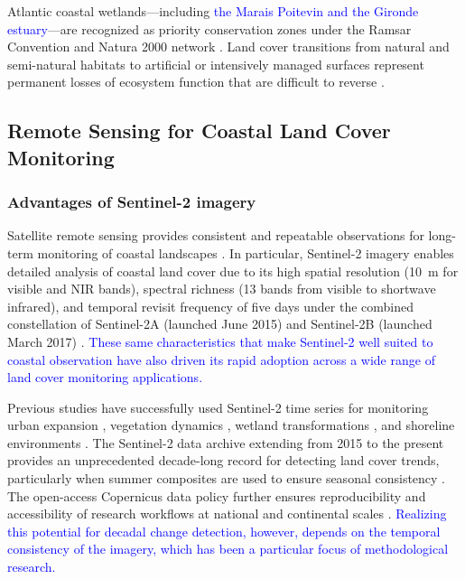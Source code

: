 \documentclass[coasts,article,submit,pdftex,moreauthors]{Definitions/mdpi}
\begin{document}
Atlantic coastal wetlands—including \textcolor{blue}{the Marais Poitevin and the Gironde estuary}—are recognized as priority conservation zones under the Ramsar Convention and Natura 2000 network \citep{barnaud2011zones,fustec2000zones,triplet2014camargue}. Land cover transitions from natural and semi-natural habitats to artificial or intensively managed surfaces represent permanent losses of ecosystem function that are difficult to reverse \citep{meur-ferec2007artificialisation,deboudt2010littoral}.

\subsection{Remote Sensing for Coastal Land Cover Monitoring}

\subsubsection{Advantages of Sentinel-2 imagery}

Satellite remote sensing provides consistent and repeatable observations for long-term monitoring of coastal landscapes \citep{Drusch2012}. In particular, Sentinel-2 imagery enables detailed analysis of coastal land cover due to its high spatial resolution (10~m for visible and NIR bands), spectral richness (13 bands from visible to shortwave infrared), and temporal revisit frequency of five days under the combined constellation of Sentinel-2A (launched June 2015) and Sentinel-2B (launched March 2017) \citep{MainKnornetal2017}. \textcolor{blue}{These same characteristics that make Sentinel-2 well suited to coastal observation have also driven its rapid adoption across a wide range of land cover monitoring applications.}

Previous studies have successfully used Sentinel-2 time series for monitoring urban expansion \citep{pesaresi2016sentinel,soille2018urban}, vegetation dynamics \citep{Yancheng2024,BGDAG2024}, wetland transformations \citep{Cherian2024,Extraction2024}, and shoreline environments \citep{Review2025,castelle2021shoreline}. The Sentinel-2 data archive extending from 2015 to the present provides an unprecedented decade-long record for detecting land cover trends, particularly when summer composites are used to ensure seasonal consistency \citep{drusch2012sentinel,Inglada2015}. The open-access Copernicus data policy further ensures reproducibility and accessibility of research workflows at national and continental scales \citep{aschbacher2012copernicus}. \textcolor{blue}{Realizing this potential for decadal change detection, however, depends on the temporal consistency of the imagery, which has been a particular focus of methodological research.}
\end{document}
